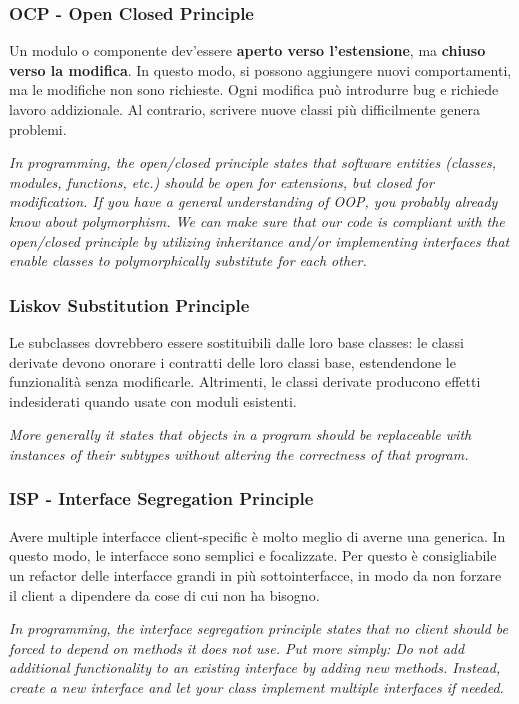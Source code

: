 \documentclass[11pt]{article}
\begin{document}
\subsubsection{OCP - Open Closed Principle}
Un modulo o componente dev'essere \textbf{aperto verso l'estensione}, ma \textbf{chiuso verso la modifica}. In questo modo, si possono aggiungere nuovi comportamenti, ma le modifiche non sono richieste. Ogni modifica può introdurre bug e richiede lavoro addizionale. Al contrario, scrivere nuove classi più difficilmente genera problemi. 
\begin{center}
    \textit{In programming, the open/closed principle states that software entities (classes, modules, functions, etc.) should be open for extensions, but closed for modification.
    If you have a general understanding of OOP, you probably already know about polymorphism. We can make sure that our code is compliant with the open/closed principle by utilizing inheritance and/or implementing interfaces that enable classes to polymorphically substitute for each other.}
\end{center}
\subsubsection{Liskov Substitution Principle}
Le subclasses dovrebbero essere sostituibili dalle loro base classes: le classi derivate devono onorare i contratti delle loro classi base, estendendone le funzionalità senza modificarle. Altrimenti, le classi derivate producono effetti indesiderati quando usate con moduli esistenti. 
\begin{center}
    \textit{More generally it states that objects in a program should be replaceable with instances of their subtypes without altering the correctness of that program.}
\end{center}
\subsubsection{ISP - Interface Segregation Principle}
Avere multiple interfacce client-specific è molto meglio di averne una generica. In questo modo, le interfacce sono semplici e focalizzate. Per questo è consigliabile un refactor delle interfacce grandi in più sottointerfacce, in modo da non forzare il client a dipendere da cose di cui non ha bisogno. 
\begin{center}
    \textit{In programming, the interface segregation principle states that no client should be forced to depend on methods it does not use.
    Put more simply: Do not add additional functionality to an existing interface by adding new methods.
    Instead, create a new interface and let your class implement multiple interfaces if needed.}
\end{center}
\end{document}
